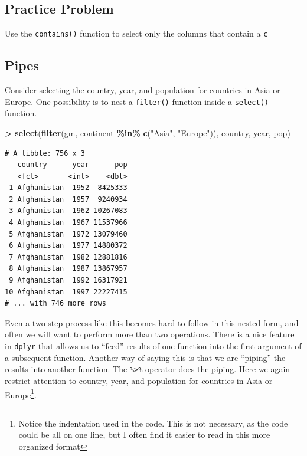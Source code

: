 \documentclass[
]{krantz}
\makeatletter
\newenvironment{Shaded}{\begin{snugshade}}{\end{snugshade}}
\newcommand{\KeywordTok}[1]{\textcolor[rgb]{0.27,0.27,0.27}{\textbf{#1}}}
\newcommand{\NormalTok}[1]{#1}
\newcommand{\OperatorTok}[1]{\textcolor[rgb]{0.43,0.43,0.43}{\textbf{#1}}}
\newcommand{\StringTok}[1]{\textcolor[rgb]{0.5,0.5,0.5}{#1}}
\newenvironment{kframe}{%
\medskip{}
\setlength{\fboxsep}{.8em}
 \def\at@end@of@kframe{}%
 \ifinner\ifhmode%
  \def\at@end@of@kframe{\end{minipage}}%
  \begin{minipage}{\columnwidth}%
 \fi\fi%
 \def\FrameCommand##1{\hskip\@totalleftmargin \hskip-\fboxsep
 \colorbox{shadecolor}{##1}\hskip-\fboxsep
     \hskip-\linewidth \hskip-\@totalleftmargin \hskip\columnwidth}%
 \MakeFramed {\advance\hsize-\width
   \@totalleftmargin\z@ \linewidth\hsize
   \@setminipage}}%
 {\par\unskip\endMakeFramed%
 \at@end@of@kframe}
\renewenvironment{Shaded}{\begin{kframe}}{\end{kframe}}
\makeatother
\begin{document}
\hypertarget{practice-problem-8}{%
\subsection{Practice Problem}\label{practice-problem-8}}

Use the \texttt{contains()} function to select only the columns that contain a \texttt{c}

\hypertarget{pipes}{%
\subsection{Pipes}\label{pipes}}

Consider selecting the country, year, and population for countries in Asia or Europe. One possibility is to nest a \texttt{filter()} function inside a \texttt{select()} function.

\begin{Shaded}
\begin{Highlighting}[]
\OperatorTok{\textgreater{}}\StringTok{ }\KeywordTok{select}\NormalTok{(}\KeywordTok{filter}\NormalTok{(gm, continent }\OperatorTok{\%in\%}\StringTok{ }\KeywordTok{c}\NormalTok{(}\StringTok{"Asia"}\NormalTok{, }\StringTok{"Europe"}\NormalTok{)), country, year, pop)}
\end{Highlighting}
\end{Shaded}

\begin{verbatim}
# A tibble: 756 x 3
   country      year      pop
   <fct>       <int>    <dbl>
 1 Afghanistan  1952  8425333
 2 Afghanistan  1957  9240934
 3 Afghanistan  1962 10267083
 4 Afghanistan  1967 11537966
 5 Afghanistan  1972 13079460
 6 Afghanistan  1977 14880372
 7 Afghanistan  1982 12881816
 8 Afghanistan  1987 13867957
 9 Afghanistan  1992 16317921
10 Afghanistan  1997 22227415
# ... with 746 more rows
\end{verbatim}

Even a two-step process like this becomes hard to follow in this nested form, and often we will want to perform more than two operations. There is a nice feature in \texttt{dplyr} that allows us to ``feed'' results of one function into the first argument of a subsequent function. Another way of saying this is that we are ``piping'' the results into another function. The \texttt{\%\textgreater{}\%} operator does the piping. Here we again restrict attention to country, year, and population for countries in Asia or Europe\footnote{Notice the indentation used in the code. This is not necessary, as the code could be all on one line, but I often find it easier to read in this more organized format}.
\end{document}
